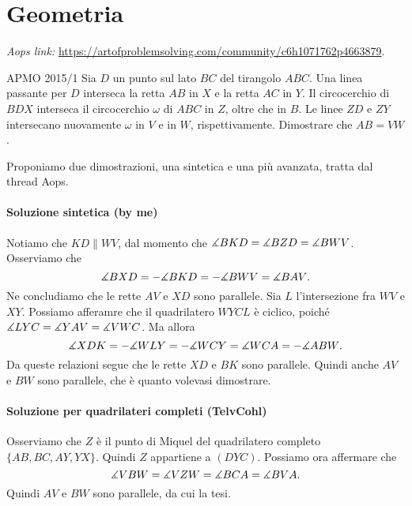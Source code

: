 \documentclass{article}
\begin{document}
\pagestyle{fancy}
\fancyhf{}
\fancyhead[R]{\nouppercase{\leftmark}}


\section{Geometria}

\textit{Aops link:}
\href{https://artofproblemsolving.com/community/c6h1071762p4663879}
{https://artofproblemsolving.com/community/c6h1071762p4663879}.

\begin{proposition}{APMO 2015/1}{}
	Sia $D$ un punto sul lato $BC$ del tirangolo $ABC$.
	Una linea passante per $D$ interseca la retta $AB$ in $X$
	e la retta $AC$ in $Y$.
	Il circocerchio di $BDX$ interseca il circocerchio $\omega$ di $ABC$ in $Z$,
	oltre che in $B$. Le linee $ZD$ e $ZY$ intersecano nuovamente $\omega$ in $V$
	e in $W$, rispettivamente. Dimostrare che $AB=VW$.
\end{proposition}

Proponiamo due dimostrazioni, una sintetica e una più avanzata,
tratta dal thread Aops.

\paragraph{Soluzione sintetica (by me)}
Notiamo che $KD\parallel WV$, dal momento che $\measuredangle{BKD}=\measuredangle{BZD}=\measuredangle{BWV}$.
Osserviamo che
\begin{equation*}
	\measuredangle{BXD}=-\measuredangle{BKD}=-\measuredangle{BWV}=\measuredangle{BAV}.
\end{equation*}
Ne concludiamo che le rette $AV$ e $XD$ sono parallele.
Sia $L$ l'intersezione fra $WV$ e $XY$. Possiamo afferamre che il quadrilatero
$WYCL$ è ciclico, poiché $\measuredangle{LYC}=\measuredangle{YAV}=\measuredangle{VWC}$.
Ma allora
\begin{equation*}
	\measuredangle{XDK}=-\measuredangle{WLY}=-\measuredangle{WCY}=\measuredangle{WCA}=-\measuredangle{ABW}.
\end{equation*}
Da queste relazioni segue che le rette $XD$ e $BK$ sono parallele.
Quindi anche $AV$ e $BW$ sono parallele, che è quanto volevasi dimostrare.

\paragraph{Soluzione per quadrilateri completi (TelvCohl)}
Osserviamo che $Z$ è il punto di Miquel del quadrilatero completo
$\{ AB, BC, AY, YX \}$. Quindi $Z$ appartiene a $(DYC)$. Possiamo ora
affermare che
\begin{equation*}
	\measuredangle{VBW}=\measuredangle{VZW}=\measuredangle{BCA}=\measuredangle{BVA}.
\end{equation*}
Quindi $AV$ e $BW$ sono parallele, da cui la tesi.
\end{document}
